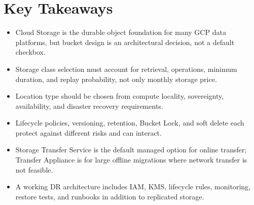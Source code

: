 \section*{Key Takeaways}
\begin{itemize}
    \item Cloud Storage is the durable object foundation for many GCP data platforms, but bucket design is an architectural decision, not a default checkbox.
    \item Storage class selection must account for retrieval, operations, minimum duration, and replay probability, not only monthly storage price.
    \item Location type should be chosen from compute locality, sovereignty, availability, and disaster recovery requirements.
    \item Lifecycle policies, versioning, retention, Bucket Lock, and soft delete each protect against different risks and can interact.
    \item Storage Transfer Service is the default managed option for online transfer; Transfer Appliance is for large offline migrations where network transfer is not feasible.
    \item A working DR architecture includes IAM, KMS, lifecycle rules, monitoring, restore tests, and runbooks in addition to replicated storage.
\end{itemize}

